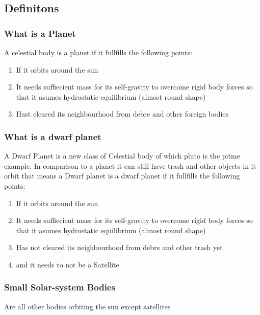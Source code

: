 \subsection{Definitons}
\subsubsection{What is a Planet}
A celestial body is a planet if it fullfills the following points:
\begin{enumerate}
    \item If it orbits around the sun\\
    \item It needs suffiecient mass for its self-gravity to overcome rigid body forces so that it asumes hydrostatic equilibrium (almost round shape)
    \item Hast cleared its neighbourhood from debre and other foreign bodies
\end{enumerate}
\subsubsection{What is a dwarf planet}
A Dwarf Planet is a new class of Celestial body of which pluto is the prime example. In comparison to a planet it can still have trash and other objects in it orbit that means a Dwarf planet is a dwarf planet if it fullfills the following points:
\begin{enumerate}
    \item If it orbits around the sun\\
    \item It needs suffiecient mass for its self-gravity to overcome rigid body forces so that it asumes hydrostatic equilibrium (almost round shape)
    \item Has not cleared its neighbourhood from debre and other trash yet
    \item and it needs to not be a Satellite
 \end{enumerate}   
\subsubsection{Small Solar-system Bodies}
Are all other bodies orbiting the sun except satellites

